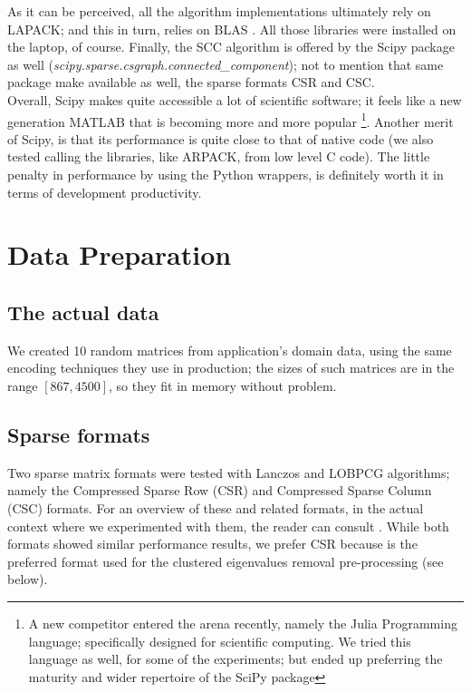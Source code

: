 As it can be perceived, all the algorithm implementations ultimately
rely on LAPACK; and this in turn, relies on BLAS \cite{blas}. All
those libraries were installed on the laptop, of course. Finally, the
SCC algorithm is offered by the Scipy package as well 
(\emph{scipy.sparse.csgraph.connected\_component}); not to mention that
same package make available as well, the sparse formats CSR and
CSC. \\

Overall, Scipy makes quite accessible a lot of scientific
software; it feels like a new generation MATLAB that is becoming more
and more popular \footnote{A new competitor entered the arena
  recently, namely the Julia Programming language; specifically
  designed for scientific computing. We tried this language as well,
  for some of the experiments; but ended up preferring the maturity
  and wider repertoire of the SciPy package}. Another merit of Scipy,
is that its performance is quite close to that of native code (we
also tested calling the libraries, like ARPACK, from low level C
code). The little penalty in performance by using the Python wrappers,
is definitely worth it in terms of development productivity. 

\section{Data Preparation}

\subsection{The actual data}
We created 10 random matrices from application's domain data, using
the same encoding techniques they use in production; the sizes of such
matrices are in the range $[867,4500]$, so they fit in memory without
problem. \\

\subsection{Sparse formats}
Two sparse matrix formats were tested with Lanczos and LOBPCG
algorithms; namely the Compressed Sparse Row (CSR) and Compressed
Sparse Column (CSC) formats. For an overview of these and related
formats, in the actual context where we experimented with them, the
reader can consult \cite{johansson15}. While both formats showed
similar performance results, we prefer CSR because is the preferred
format used for the clustered eigenvalues removal pre-processing (see
below). 

